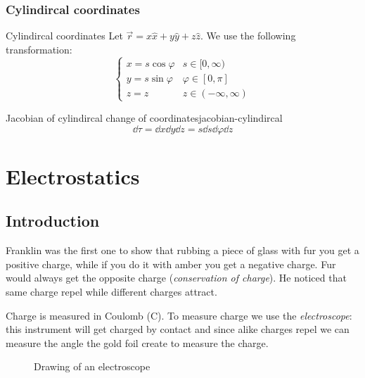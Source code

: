 \documentclass[12pt]{extarticle}
\begin{document}
\subsubsection{Cylindircal coordinates}

\begin{definition}{Cylindircal coordinates}
    Let $\vec r = x \hat x + y \hat y + z \hat z$.
    We use the following transformation:
    \begin{equation}
        \begin{cases}
            x = s \cos \varphi & s \in [0, \infty)       \\
            y = s \sin \varphi & \varphi \in [0, \pi]    \\
            z = z              & z \in (-\infty, \infty)
        \end{cases}
    \end{equation}
\end{definition}

\begin{proposition}{Jacobian of cylindircal change of coordinates}{jacobian-cylindircal}
    \begin{equation}
        \dd{\tau} = \dd{x} \dd{y} \dd{z} = s \dd{s} \dd{\varphi} \dd{z}
    \end{equation}
\end{proposition}

\section{Electrostatics}

\subsection{Introduction}

Franklin was the first one to show that rubbing a piece of glass with fur you get a positive charge, while if you do it with amber you get a negative charge.
Fur would always get the opposite charge (\emph{conservation of charge}).
He noticed that same charge repel while different charges attract.

Charge is measured in Coulomb ($\si{\coulomb}$).
To measure charge we use the \emph{electroscope}:
this instrument will get charged by contact and since alike charges repel we can measure the angle the gold foil create to measure the charge.

\begin{figure}[H]
    \centering
    
    \caption{Drawing of an electroscope}
\end{figure}
\end{document}
